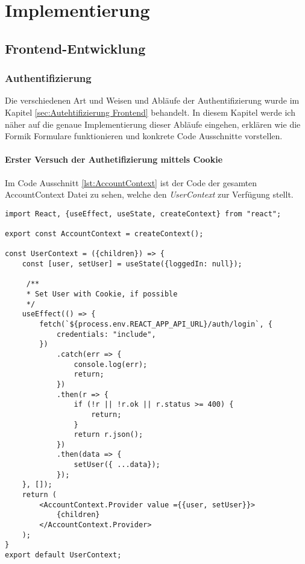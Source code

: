 
\chapter{Implementierung}
    \section{Frontend-Entwicklung}
    \subsection{Authentifizierung}
    \label{sec:Auth-Impl-Front}
Die verschiedenen Art und Weisen und Abläufe der Authentifizierung wurde im Kapitel \ref{sec:Autehtifizierung Frontend} behandelt.
In diesem Kapitel werde ich näher auf die genaue Implementierung dieser Abläufe eingehen, erklären wie die Formik Formulare funktionieren und konkrete Code Ausschnitte vorstellen.
    \subsubsection{Erster Versuch der Authetifizierung mittels Cookie}
    \label{sec:Cookie-auth}
Im Code Ausschnitt \ref{lst:AccountContext} ist der Code der gesamten AccountContext Datei zu sehen, welche den \textit{UserContext} zur Verfügung stellt.

\begin{lstlisting}[style=codeStyle, caption={Die AccountContext.js-Datei}, label={lst:AccountContext}]
import React, {useEffect, useState, createContext} from "react";

export const AccountContext = createContext();

const UserContext = ({children}) => {
    const [user, setUser] = useState({loggedIn: null});

     /**
     * Set User with Cookie, if possible
     */
    useEffect(() => {
        fetch(`${process.env.REACT_APP_API_URL}/auth/login`, {
            credentials: "include",
        })
            .catch(err => {
                console.log(err);
                return;
            })
            .then(r => {
                if (!r || !r.ok || r.status >= 400) {
                    return;
                }
                return r.json();
            })
            .then(data => {
                setUser({ ...data});
            });
    }, []);
    return (
        <AccountContext.Provider value ={{user, setUser}}>
            {children}
        </AccountContext.Provider>
    );
}
export default UserContext;
\end{lstlisting}


